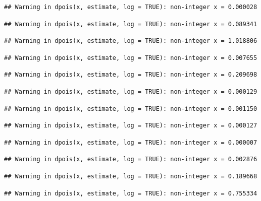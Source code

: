 \documentclass[]{article}
\begin{document}
\begin{verbatim}
## Warning in dpois(x, estimate, log = TRUE): non-integer x = 0.000028
\end{verbatim}

\begin{verbatim}
## Warning in dpois(x, estimate, log = TRUE): non-integer x = 0.089341
\end{verbatim}

\begin{verbatim}
## Warning in dpois(x, estimate, log = TRUE): non-integer x = 1.018806
\end{verbatim}

\begin{verbatim}
## Warning in dpois(x, estimate, log = TRUE): non-integer x = 0.007655
\end{verbatim}

\begin{verbatim}
## Warning in dpois(x, estimate, log = TRUE): non-integer x = 0.209698
\end{verbatim}

\begin{verbatim}
## Warning in dpois(x, estimate, log = TRUE): non-integer x = 0.000129
\end{verbatim}

\begin{verbatim}
## Warning in dpois(x, estimate, log = TRUE): non-integer x = 0.001150
\end{verbatim}

\begin{verbatim}
## Warning in dpois(x, estimate, log = TRUE): non-integer x = 0.000127
\end{verbatim}

\begin{verbatim}
## Warning in dpois(x, estimate, log = TRUE): non-integer x = 0.000007
\end{verbatim}

\begin{verbatim}
## Warning in dpois(x, estimate, log = TRUE): non-integer x = 0.002876
\end{verbatim}

\begin{verbatim}
## Warning in dpois(x, estimate, log = TRUE): non-integer x = 0.189668
\end{verbatim}

\begin{verbatim}
## Warning in dpois(x, estimate, log = TRUE): non-integer x = 0.755334
\end{verbatim}
\end{document}
